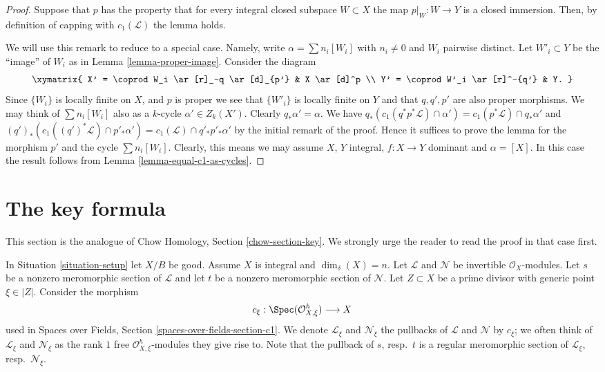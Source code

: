 \begin{proof}
Suppose that $p$ has the property that for every integral
closed subspace $W \subset X$ the map $p|_W : W \to Y$
is a closed immersion. Then, by definition of capping
with $c_1(\mathcal{L})$ the lemma holds.

\medskip\noindent
We will use this remark to reduce to a special case. Namely,
write $\alpha = \sum n_i[W_i]$ with $n_i \not = 0$ and $W_i$ pairwise
distinct. Let $W'_i \subset Y$ be the ``image'' of $W_i$ as
in Lemma \ref{lemma-proper-image}. Consider the diagram
$$
\xymatrix{
X' = \coprod W_i \ar[r]_-q \ar[d]_{p'} & X \ar[d]^p \\
Y' = \coprod W'_i \ar[r]^-{q'} & Y.
}
$$
Since $\{W_i\}$ is locally finite on $X$, and $p$ is proper
we see that $\{W'_i\}$ is locally finite on $Y$ and that
$q, q', p'$ are also proper morphisms.
We may think of $\sum n_i[W_i]$ also as a $k$-cycle
$\alpha' \in Z_k(X')$. Clearly $q_*\alpha' = \alpha$.
We have
$q_*(c_1(q^*p^*\mathcal{L}) \cap \alpha')
= c_1(p^*\mathcal{L}) \cap q_*\alpha'$
and
$(q')_*(c_1((q')^*\mathcal{L}) \cap p'_*\alpha') =
c_1(\mathcal{L}) \cap q'_*p'_*\alpha'$ by the initial
remark of the proof. Hence it suffices to prove the lemma
for the morphism $p'$ and the cycle $\sum n_i[W_i]$.
Clearly, this means we may assume $X$, $Y$ integral,
$f : X \to Y$ dominant and $\alpha = [X]$.
In this case the result follows from
Lemma \ref{lemma-equal-c1-as-cycles}.
\end{proof}













\section{The key formula}
\label{section-key}

\noindent
This section is the analogue of Chow Homology, Section \ref{chow-section-key}.
We strongly urge the reader to read the proof in that case first.

\medskip\noindent
In Situation \ref{situation-setup} let $X/B$ be good. Assume $X$ is integral
and $\dim_\delta(X) = n$. Let $\mathcal{L}$ and $\mathcal{N}$ be invertible
$\mathcal{O}_X$-modules. Let $s$ be a nonzero meromorphic section of
$\mathcal{L}$ and let $t$ be a nonzero meromorphic section of $\mathcal{N}$.
Let $Z \subset X$ be a prime divisor with generic point $\xi \in |Z|$.
Consider the morphism
$$
c_\xi : \Spec(\mathcal{O}_{X, \xi}^h) \longrightarrow X
$$
used in Spaces over Fields, Section \ref{spaces-over-fields-section-c1}.
We denote $\mathcal{L}_\xi$ and $\mathcal{N}_\xi$ the pullbacks
of $\mathcal{L}$ and $\mathcal{N}$ by $c_\xi$; we often think of
$\mathcal{L}_\xi$ and $\mathcal{N}_\xi$ as the rank $1$ free
$\mathcal{O}_{X, \xi}^h$-modules they give rise to.
Note that the pullback of $s$, resp.\ $t$ is a regular meromorphic
section of $\mathcal{L}_\xi$, resp.\ $\mathcal{N}_\xi$.

